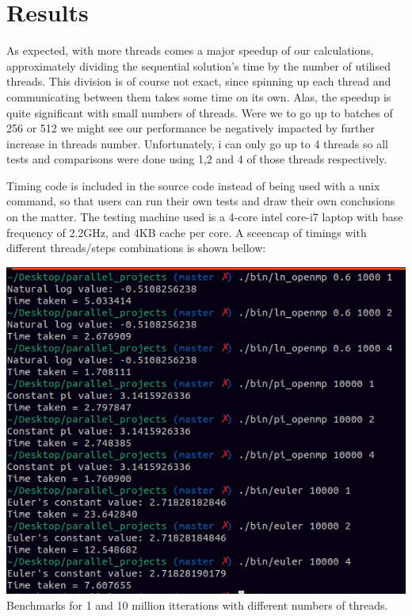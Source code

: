 \documentclass{article}
\begin{document}
\section*{Results}

As expected, with more threads comes a major speedup of our calculations, approximately dividing the sequential solution's time by the number of utilised threads.
This division is of course not exact, since spinning up each thread and communicating between them takes some time on its own. Alas, the speedup is quite significant with small numbers of threads.
Were we to go up to batches of 256 or 512 we might see our performance be negatively impacted by further increase in threads number.
Unfortunately, i can only go up to 4 threads so all tests and comparisons were done using 1,2 and 4 of those threads respectively.

Timing code is included in the source code instead of being used with a unix command, so that users can run their own tests and draw their own conclusions on the matter.
The testing machine used is a 4-core intel core-i7 laptop with base frequency of 2.2GHz, and 4KB cache per core. 
A sceencap of timings with different threads/steps combinations is shown bellow:

\begin{center}
	\includegraphics[width=\linewidth]{./benchmarks.png}
	\centering Benchmarks for 1 and 10 million itterations with different numbers of threads.
	
\end{center}
\end{document}
